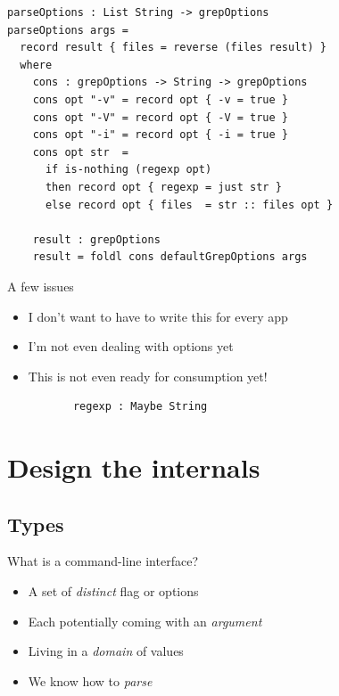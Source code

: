 \documentclass[dvipsnames]{beamer}
\begin{document}
\begin{frame}[fragile]
\begin{verbatim}
parseOptions : List String -> grepOptions
parseOptions args =
  record result { files = reverse (files result) }
  where
    cons : grepOptions -> String -> grepOptions
    cons opt "-v" = record opt { -v = true }
    cons opt "-V" = record opt { -V = true }
    cons opt "-i" = record opt { -i = true }
    cons opt str  =
      if is-nothing (regexp opt)
      then record opt { regexp = just str }
      else record opt { files  = str :: files opt }

    result : grepOptions
    result = foldl cons defaultGrepOptions args
\end{verbatim}
\end{frame}

\begin{frame}[fragile]{A few issues}
  \begin{itemize}
    \item I don't want to have to write this for every app
    \item I'm not even dealing with options yet
    \item This is not even ready for consumption yet!
      \begin{verbatim}
       regexp : Maybe String
      \end{verbatim}
  \end{itemize}
\end{frame}

\section{Design the internals}
\subsection{Types}

\begin{frame}{What is a command-line interface?}

  \begin{itemize}
    \item A set of \emph{distinct} flag or options
    \item Each potentially coming with an \emph{argument}
    \item Living in a \emph{domain} of values
    \item We know how to \emph{parse}
  \end{itemize}
\end{frame}
\end{document}
